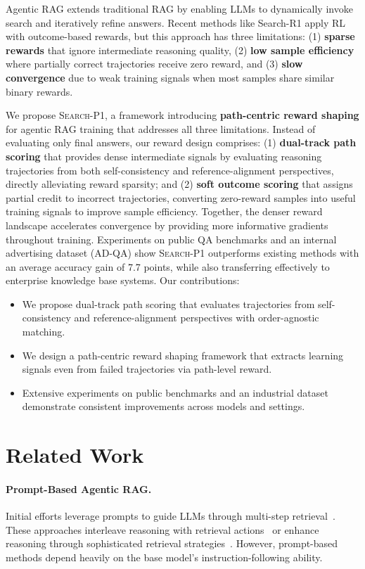 \documentclass[11pt]{article}
\newcommand{\method}{\textsc{Search-P1}\xspace}
\begin{document}
Agentic RAG extends traditional RAG by enabling LLMs to dynamically invoke search and iteratively refine answers.
Recent methods like Search-R1 apply RL with outcome-based rewards, but this approach has three limitations: (1) \textbf{sparse rewards} that ignore intermediate reasoning quality, (2) \textbf{low sample efficiency} where partially correct trajectories receive zero reward, and (3) \textbf{slow convergence} due to weak training signals when most samples share similar binary rewards.

We propose \method, a framework introducing \textbf{path-centric reward shaping} for agentic RAG training that addresses all three limitations.
Instead of evaluating only final answers, our reward design comprises: (1) \textbf{dual-track path scoring} that provides dense intermediate signals by evaluating reasoning trajectories from both self-consistency and reference-alignment perspectives, directly alleviating reward sparsity; and (2) \textbf{soft outcome scoring} that assigns partial credit to incorrect trajectories, converting zero-reward samples into useful training signals to improve sample efficiency.
Together, the denser reward landscape accelerates convergence by providing more informative gradients throughout training.
Experiments on public QA benchmarks and an internal advertising dataset (AD-QA) show \method outperforms existing methods with an average accuracy gain of 7.7 points, while also transferring effectively to enterprise knowledge base systems.
Our contributions:
\begin{itemize}
    \item We propose dual-track path scoring that evaluates trajectories from self-consistency and reference-alignment perspectives with order-agnostic matching.

    \item We design a path-centric reward shaping framework that extracts learning signals even from failed trajectories via path-level reward.

    \item Extensive experiments on public benchmarks and an industrial dataset demonstrate consistent improvements across models and settings.
\end{itemize}

\section{Related Work}
\label{sec:related_work}

\paragraph{Prompt-Based Agentic RAG.}
Initial efforts leverage prompts to guide LLMs through multi-step retrieval~\cite{singh2025agenticretrievalaugmentedgenerationsurvey,202507.2024}.
These approaches interleave reasoning with retrieval actions~\cite{yao2023react,trivedi-etal-2023-interleaving} or enhance reasoning through sophisticated retrieval strategies~\cite{li2025searcho1agenticsearchenhancedlarge,wang2025chainofretrievalaugmentedgeneration,guan2025deepragthinkingretrievalstep}.
However, prompt-based methods depend heavily on the base model's instruction-following ability.
\end{document}
